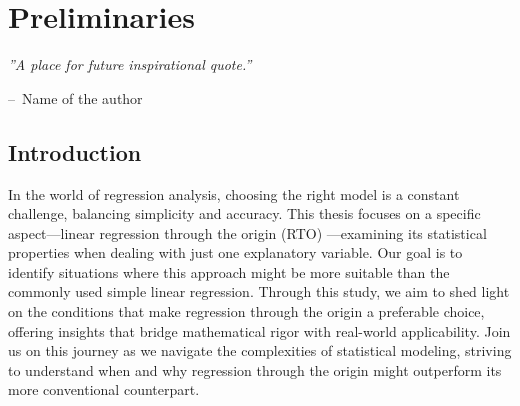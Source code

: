 \documentclass[12pt,a4paper,oneside]{book} %
\makeatletter
\newenvironment{chapquote}[2][2em]
{\setlength{\@tempdima}{#1}%
	\def\chapquote@author{#2}%
	\parshape 1 \@tempdima \dimexpr\textwidth-2\@tempdima\relax%
	\itshape}
{\par\normalfont\hfill--\ \chapquote@author\hspace*{\@tempdima}\par\bigskip}
\newcommand{\hsp}{\hspace{20pt}}
\makeatother
\begin{document}

	\frontmatter
	
	\tableofcontents
		
	\mainmatter
	
	\pagestyle{plain}
	
	\titleformat{\chapter}[display]{\normalfont\huge\bfseries}{\chaptertitlename\ \thechapter}{20pt}{\Huge}
	\titlespacing*{\chapter}{10pt}{20pt}{40pt}
	 
	\titleformat{\chapter}[hang]{\Huge\bfseries}{\thechapter.\hsp}{0pt}{\Huge\bfseries} 
	  
	\chapter{Preliminaries} 
	
	\begin{chapquote}{Name of the author} %
	''A place for future inspirational quote.''
	\end{chapquote}


	\section{Introduction}


In the world of regression analysis, choosing the right model is a constant challenge, balancing simplicity and accuracy. This thesis focuses on a specific aspect—linear regression through the origin (RTO) —examining its statistical properties when dealing with just one explanatory variable. Our goal is to identify situations where this approach might be more suitable than the commonly used simple linear regression. Through this study, we aim to shed light on the conditions that make regression through the origin a preferable choice, offering insights that bridge mathematical rigor with real-world applicability. Join us on this journey as we navigate the complexities of statistical modeling, striving to understand when and why regression through the origin might outperform its more conventional counterpart.
\end{document}
